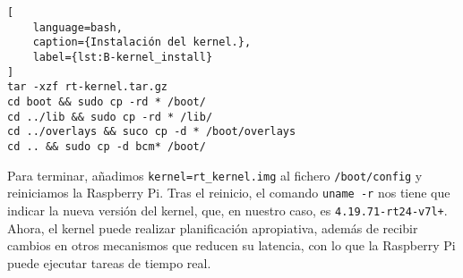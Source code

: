 \begin{lstlisting}[
    language=bash,
    caption={Instalación del kernel.},
    label={lst:B-kernel_install}
]
tar -xzf rt-kernel.tar.gz
cd boot && sudo cp -rd * /boot/
cd ../lib && sudo cp -rd * /lib/
cd ../overlays && suco cp -d * /boot/overlays
cd .. && sudo cp -d bcm* /boot/
\end{lstlisting}

Para terminar, añadimos \lstinline{kernel=rt_kernel.img} al fichero
\texttt{/boot/config} y reiniciamos la Raspberry Pi. Tras el reinicio, el
comando \lstinline{uname -r} nos tiene que indicar la nueva versión del kernel,
que, en nuestro caso, es \texttt{4.19.71-rt24-v7l+}. Ahora, el kernel puede
realizar planificación apropiativa, además de recibir cambios en otros
mecanismos que reducen su latencia, con lo que la Raspberry Pi puede ejecutar
tareas de tiempo real.
